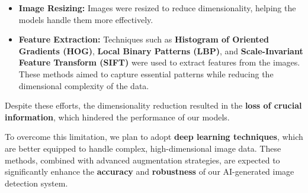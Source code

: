 \documentclass[10pt,twocolumn,letterpaper]{article}
\begin{document}
\begin{itemize}
    \item \textbf{Image Resizing:} Images were resized to reduce dimensionality, helping the models handle them more effectively.
    \item \textbf{Feature Extraction:} Techniques such as \textbf{Histogram of Oriented Gradients (HOG)}, \textbf{Local Binary Patterns (LBP)}, and \textbf{Scale-Invariant Feature Transform (SIFT)} were used to extract features from the images. These methods aimed to capture essential patterns while reducing the dimensional complexity of the data.
\end{itemize}

Despite these efforts, the dimensionality reduction resulted in the \textbf{loss of crucial information}, which hindered the performance of our models.

To overcome this limitation, we plan to adopt \textbf{deep learning techniques}, which are better equipped to handle complex, high-dimensional image data. These methods, combined with advanced augmentation strategies, are expected to significantly enhance the \textbf{accuracy} and \textbf{robustness} of our AI-generated image detection system.

{\small


}




\end{document}
